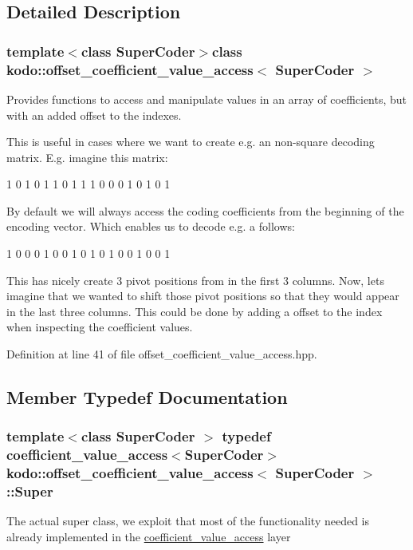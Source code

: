 \subsection{Detailed Description}
\subsubsection*{template$<$class Super\-Coder$>$class kodo\-::offset\-\_\-coefficient\-\_\-value\-\_\-access$<$ Super\-Coder $>$}

Provides functions to access and manipulate values in an array of coefficients, but with an added offset to the indexes. 

This is useful in cases where we want to create e.\-g. an non-\/square decoding matrix. E.\-g. imagine this matrix\-:

1 0 1 0 1 1 0 1 1 1 0 0 0 1 0 1 0 1

By default we will always access the coding coefficients from the beginning of the encoding vector. Which enables us to decode e.\-g. a follows\-:

1 0 0 0 1 0 0 1 0 1 0 1 0 0 1 0 0 1

This has nicely create 3 pivot positions from in the first 3 columns. Now, lets imagine that we wanted to shift those pivot positions so that they would appear in the last three columns. This could be done by adding a offset to the index when inspecting the coefficient values. 

Definition at line 41 of file offset\-\_\-coefficient\-\_\-value\-\_\-access.\-hpp.



\subsection{Member Typedef Documentation}
\hypertarget{classkodo_1_1offset__coefficient__value__access_afbb688e0f2bcccea653a5bc9becaa16f}{
\subsubsection[{Super}]{\setlength{\rightskip}{0pt plus 5cm}template$<$class Super\-Coder $>$ typedef {\bf coefficient\-\_\-value\-\_\-access}$<$Super\-Coder$>$ {\bf kodo\-::offset\-\_\-coefficient\-\_\-value\-\_\-access}$<$ Super\-Coder $>$\-::{\bf Super}}}\label{classkodo_1_1offset__coefficient__value__access_afbb688e0f2bcccea653a5bc9becaa16f}
The actual super class, we exploit that most of the functionality needed is already implemented in the \hyperlink{classkodo_1_1coefficient__value__access}{coefficient\-\_\-value\-\_\-access} layer 


